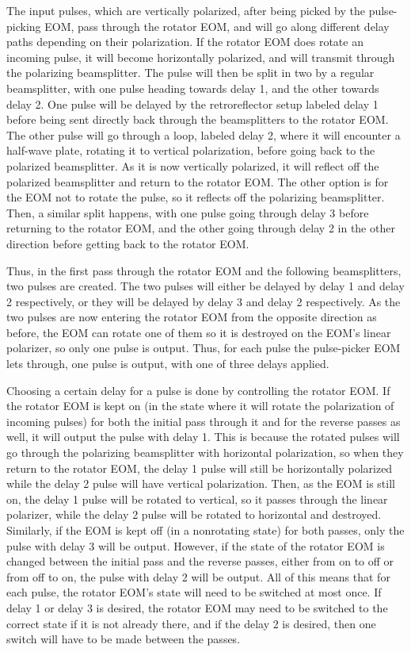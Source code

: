 \documentclass[pdftex,12pt,a4paper]{article}
\begin{document}
The input pulses, which are vertically polarized, after being picked by the pulse-picking EOM, pass through the rotator EOM, and will go along different delay paths depending on their polarization. If the rotator EOM does rotate an incoming pulse, it will become horizontally polarized, and will transmit through the polarizing beamsplitter. The pulse will then be split in two by a regular beamsplitter, with one pulse heading towards delay 1, and the other towards delay 2. One pulse will be delayed by the retroreflector setup labeled delay 1 before being sent directly back through the beamsplitters to the rotator EOM. The other pulse will go through a loop, labeled delay 2, where it will encounter a half-wave plate, rotating it to vertical polarization, before going back to the polarized beamsplitter. As it is now vertically polarized, it will reflect off the polarized beamsplitter and return to the rotator EOM. The other option is for the EOM not to rotate the pulse, so it reflects off the polarizing beamsplitter. Then, a similar split happens, with one pulse going through delay 3 before returning to the rotator EOM, and the other going through delay 2 in the other direction before getting back to the rotator EOM.

Thus, in the first pass through the rotator EOM and the following beamsplitters, two pulses are created. The two pulses will either be delayed by delay 1 and delay 2 respectively, or they will be delayed by delay 3 and delay 2 respectively. As the two pulses are now entering the rotator EOM from the opposite direction as before, the EOM can rotate one of them so it is destroyed on the EOM's linear polarizer, so only one pulse is output. Thus, for each pulse the pulse-picker EOM lets through, one pulse is output, with one of three delays applied.

Choosing a certain delay for a pulse is done by controlling the rotator EOM. If the rotator EOM is kept on (in the state where it will rotate the polarization of incoming pulses) for both the initial pass through it and for the reverse passes as well, it will output the pulse with delay 1. This is because the rotated pulses will go through the polarizing beamsplitter with horizontal polarization, so when they return to the rotator EOM, the delay 1 pulse will still be horizontally polarized while the delay 2 pulse will have vertical polarization. Then, as the EOM is still on, the delay 1 pulse will be rotated to vertical, so it passes through the linear polarizer, while the delay 2 pulse will be rotated to horizontal and destroyed. Similarly, if the EOM is kept off (in a nonrotating state) for both passes, only the pulse with delay 3 will be output. However, if the state of the rotator EOM is changed between the initial pass and the reverse passes, either from on to off or from off to on, the pulse with delay 2 will be output. All of this means that for each pulse, the rotator EOM's state will need to be switched at most once. If delay 1 or delay 3 is desired, the rotator EOM may need to be switched to the correct state if it is not already there, and if the delay 2 is desired, then one switch will have to be made between the passes.
\end{document}
